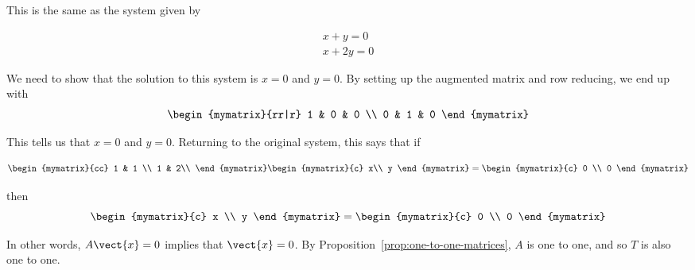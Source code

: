 \begin{solution}
This is the same as the system given by

\begin{equation*}
\begin{array}{c}
x + y = 0 \\
x + 2y = 0
\end{array}
\end{equation*}

We need to show that the solution to this system is $x = 0$ and $y = 0$. By setting up the augmented matrix and row reducing, we end up with
\begin{equation*} \begin{mymatrix}{rr|r}
1 & 0 & 0 \\
0 & 1 & 0
\end{mymatrix}
\end{equation*}

This tells us that $x = 0$ and $y = 0$. Returning to the original system, this says that if

\begin{equation*}
\begin{mymatrix}{cc}
1 & 1 \\
1 & 2\\
\end{mymatrix}
\begin{mymatrix}{c}
x\\
y
\end{mymatrix}
=
\begin{mymatrix}{c}
0 \\
0
\end{mymatrix}
\end{equation*}

then
\begin{equation*}
\begin{mymatrix}{c}
x \\
y
\end{mymatrix}
=
\begin{mymatrix}{c}
0 \\
0
\end{mymatrix}
\end{equation*}

In other words, $A\vect{x}=0$ implies that $\vect{x}=0$. By
Proposition~\ref{prop:one-to-one-matrices}, $A$ is one to one, and so $T$ is also one to one.


\end{solution}
